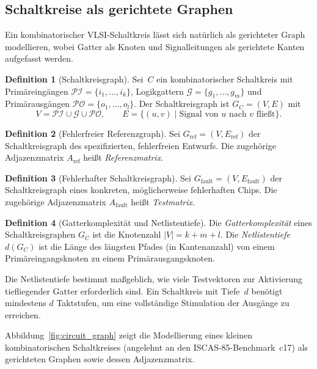 ﻿\documentclass[a4paper,12pt]{article}
\theoremstyle{definition}
\newtheorem{definition}{Definition}
\begin{document}
\subsection{Schaltkreise als gerichtete Graphen}

Ein kombinatorischer VLSI-Schaltkreis lässt sich natürlich als gerichteter
Graph modellieren, wobei Gatter als Knoten und Signalleitungen als gerichtete
Kanten aufgefasst werden.

\begin{definition}[Schaltkreisgraph]
  \sloppy
  Sei~$C$ ein kombinatorischer Schaltkreis mit Primär\-eingängen
  $\mathcal{PI} = \{i_1, \ldots, i_k\}$, Logik\-gattern
  $\mathcal{G} = \{g_1, \ldots, g_m\}$ und Primär\-ausgängen
  $\mathcal{PO} = \{o_1, \ldots, o_l\}$.
  Der Schaltkreisgraph ist $G_C = (V, E)$ mit
  \[
    V = \mathcal{PI} \cup \mathcal{G} \cup \mathcal{PO}, \qquad
    E = \{(u, v) \mid \text{Signal von~$u$ nach~$v$ fließt}\}.
  \]
\end{definition}

\begin{definition}[Fehlerfreier Referenzgraph]
  Sei $G_{\mathrm{ref}} = (V, E_{\mathrm{ref}})$ der Schaltkreisgraph des
  spezifizierten, fehlerfreien Entwurfs. Die zugehörige Adjazenzmatrix
  $A_{\mathrm{ref}}$ heißt \emph{Referenzmatrix}.
\end{definition}

\begin{definition}[Fehlerhafter Schaltkreisgraph]
  Sei $G_{\mathrm{fault}} = (V, E_{\mathrm{fault}})$ der Schaltkreisgraph
  eines konkreten, möglicherweise fehlerhaften Chips. Die zugehörige
  Adjazenzmatrix $A_{\mathrm{fault}}$ heißt \emph{Testmatrix}.
\end{definition}

\begin{definition}[Gatterkomplexität und Netlistentiefe]
  Die \emph{Gatterkomplexität} eines Schaltkreisgraphen $G_C$ ist die
  Knotenzahl $|V| = k + m + l$.
  Die \emph{Netlistentiefe} $d(G_C)$ ist die Länge des längsten Pfades
  (in Kantenanzahl) von einem Primäreingangs\-knoten zu einem
  Primärausgangs\-knoten.
\end{definition}

Die Netlistentiefe bestimmt maßgeblich, wie viele Testvektoren zur
Aktivierung tiefliegender Gatter erforderlich sind.
Ein Schaltkreis mit Tiefe~$d$ benötigt mindestens $d$ Taktstufen, um eine
vollständige Stimulation der Ausgänge zu erreichen.

Abbildung~\ref{fig:circuit_graph} zeigt die Modellierung eines kleinen
kombinatorischen Schaltkreises (angelehnt an den ISCAS-85-Benchmark~c17)
als gerichteten Graphen sowie dessen Adjazenzmatrix.
\end{document}
